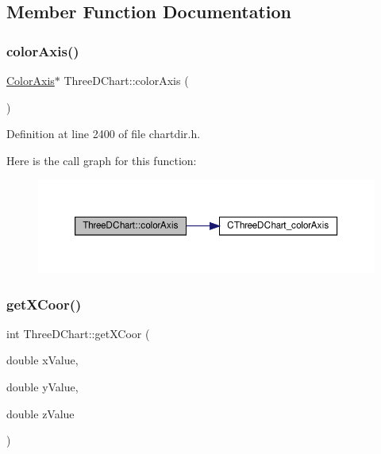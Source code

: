 \subsection{Member Function Documentation}
\mbox{\label{class_three_d_chart_a1c73565a367bcc835097a8dbceebaf7b}} 
\subsubsection{\texorpdfstring{color\+Axis()}{colorAxis()}}
{\footnotesize\ttfamily \hyperlink{class_color_axis}{Color\+Axis}$\ast$ Three\+D\+Chart\+::color\+Axis (\begin{DoxyParamCaption}{ }\end{DoxyParamCaption})\hspace{0.3cm}{\ttfamily [inline]}}



Definition at line 2400 of file chartdir.\+h.

Here is the call graph for this function\+:
\nopagebreak
\begin{figure}[H]
\begin{center}
\leavevmode
\includegraphics[width=350pt]{class_three_d_chart_a1c73565a367bcc835097a8dbceebaf7b_cgraph}
\end{center}
\end{figure}
\mbox{\label{class_three_d_chart_a816f5ea854803cabe8d6e5f1043226fb}} 
\subsubsection{\texorpdfstring{get\+X\+Coor()}{getXCoor()}}
{\footnotesize\ttfamily int Three\+D\+Chart\+::get\+X\+Coor (\begin{DoxyParamCaption}\item[{double}]{x\+Value,  }\item[{double}]{y\+Value,  }\item[{double}]{z\+Value }\end{DoxyParamCaption})\hspace{0.3cm}{\ttfamily [inline]}}



